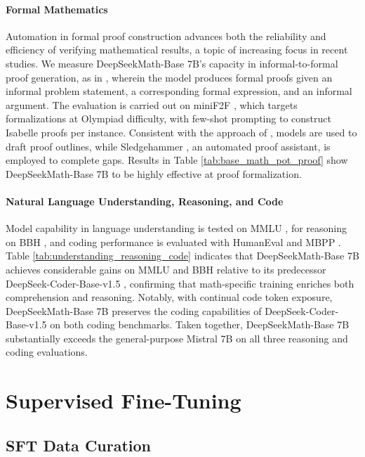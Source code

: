 \paragraph{Formal Mathematics}

Automation in formal proof construction advances both the reliability and efficiency of verifying mathematical results, a topic of increasing focus in recent studies. We measure DeepSeekMath-Base 7B's capacity in informal-to-formal proof generation, as in \citep{dsp_proof}, wherein the model produces formal proofs given an informal problem statement, a corresponding formal expression, and an informal argument. The evaluation is carried out on miniF2F \citep{minif2f}, which targets formalizations at Olympiad difficulty, with few-shot prompting to construct Isabelle proofs per instance. Consistent with the approach of \cite{dsp_proof}, models are used to draft proof outlines, while Sledgehammer \citep{sledgehammer}, an automated proof assistant, is employed to complete gaps. Results in Table \ref{tab:base_math_pot_proof} show DeepSeekMath-Base 7B to be highly effective at proof formalization.

\paragraph{Natural Language Understanding, Reasoning, and Code}

Model capability in language understanding is tested on MMLU \citep{mmlu}, for reasoning on BBH \citep{bbh}, and coding performance is evaluated with HumanEval \citep{codex} and MBPP \citep{mbpp}. Table \ref{tab:understanding_reasoning_code} indicates that DeepSeekMath-Base 7B achieves considerable gains on MMLU and BBH relative to its predecessor DeepSeek-Coder-Base-v1.5 \citep{deepseek-coder}, confirming that math-specific training enriches both comprehension and reasoning. Notably, with continual code token exposure, DeepSeekMath-Base 7B preserves the coding capabilities of DeepSeek-Coder-Base-v1.5 on both coding benchmarks. Taken together, DeepSeekMath-Base 7B substantially exceeds the general-purpose Mistral 7B \citep{mistral} on all three reasoning and coding evaluations.

\section{Supervised Fine-Tuning}

\subsection{SFT Data Curation}

